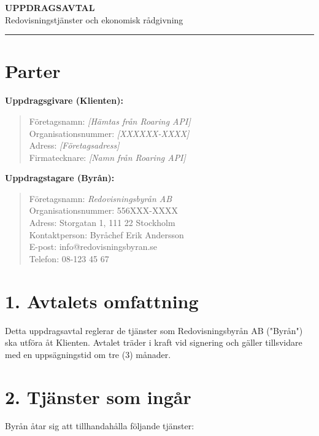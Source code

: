 \documentclass[a4paper,11pt]{article}
\begin{document}
\begin{center}
  {\LARGE \textbf{UPPDRAGSAVTAL}}\\[0.3cm]
  {\large Redovisningstjänster och ekonomisk rådgivning}\\[0.5cm]
  \rule{\linewidth}{0.5pt}
\end{center}

\vspace{1cm}

\section*{Parter}

\textbf{Uppdragsgivare (Klienten):}
\begin{quote}
  Företagsnamn: \textit{[Hämtas från Roaring API]}\\
  Organisationsnummer: \textit{[XXXXXX-XXXX]}\\
  Adress: \textit{[Företagsadress]}\\
  Firmatecknare: \textit{[Namn från Roaring API]}
\end{quote}

\textbf{Uppdragstagare (Byrån):}
\begin{quote}
  Företagsnamn: \textit{Redovisningsbyrån AB}\\
  Organisationsnummer: 556XXX-XXXX\\
  Adress: Storgatan 1, 111 22 Stockholm\\
  Kontaktperson: Byråchef Erik Andersson\\
  E-post: info@redovisningsbyran.se\\
  Telefon: 08-123 45 67
\end{quote}

\vspace{0.5cm}

\section*{1. Avtalets omfattning}

Detta uppdragsavtal reglerar de tjänster som Redovisningsbyrån AB ("Byrån") ska utföra åt Klienten. Avtalet träder i kraft vid signering och gäller tillsvidare med en uppsägningstid om tre (3) månader.

\section*{2. Tjänster som ingår}

Byrån åtar sig att tillhandahålla följande tjänster:
\end{document}
